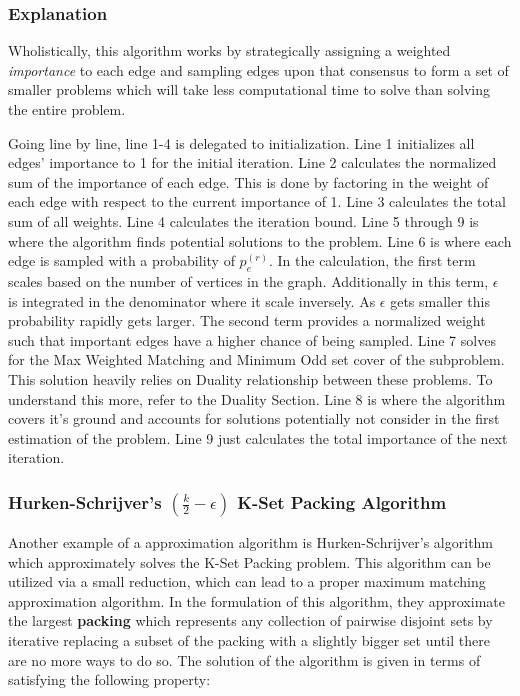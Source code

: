 \subsubsection*{Explanation}

Wholistically, this algorithm works by strategically assigning a weighted \textit{importance} to each edge and sampling edges upon that consensus to form a set of smaller problems which will take less computational time to solve than solving the entire problem.

Going line by line, line 1-4 is delegated to initialization.
Line 1 initializes all edges' importance to 1 for the initial iteration. Line 2 calculates the normalized sum of the importance of each edge. 
This is done by factoring in the weight of each edge with respect to the current importance of 1. Line 3 calculates the total sum of all weights. Line 4 calculates the iteration bound. Line 5 through 9 is where the algorithm finds potential solutions to the problem. Line 6 is where each edge is sampled with a probability of $p_e^{(r)}$. 
In the calculation, the first term scales based on the number of vertices in the graph. Additionally in this term, $\epsilon$ is integrated in the denominator where it scale inversely.
As $\epsilon$ gets smaller this probability rapidly gets larger. The second term provides a normalized weight such that important edges have a higher chance of being sampled. 
Line 7 solves for the Max Weighted Matching and Minimum Odd set cover of the subproblem. This solution heavily relies on Duality relationship between these problems. To understand this more, refer to the Duality Section.
Line 8 is where the algorithm covers it's ground and accounts for solutions potentially not consider in the first estimation of the problem. Line 9 just calculates the total importance of the next iteration. 

\subsubsection{Hurken-Schrijver's $(\frac{k}{2}-\epsilon)$ K-Set Packing Algorithm}
Another example of a approximation algorithm is Hurken-Schrijver's algorithm \cite{Hurkens1989OnTS} which approximately solves the K-Set Packing problem. This algorithm can be utilized via a small reduction, which can lead to a proper maximum matching approximation algorithm. In the formulation of this algorithm, they approximate the largest \textbf{packing} which represents any collection of pairwise disjoint sets by iterative replacing a subset of the packing with a slightly bigger set until there are no more ways to do so. The solution of the algorithm is given in terms of satisfying the following property:

